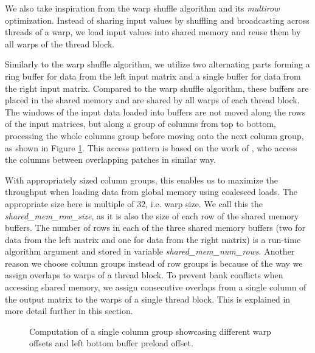 We also take inspiration from the warp shuffle algorithm and its \textit{multirow} optimization. Instead of sharing input values by shuffling and broadcasting across threads of a warp, we load input values into shared memory and reuse them by all warps of the thread block.

Similarly to the warp shuffle algorithm, we utilize two alternating parts forming a ring buffer for data from the left input matrix and a single buffer for data from the right input matrix. Compared to the warp shuffle algorithm,
these buffers are placed in the shared memory and are shared by all warps of each thread block. The windows of the input data loaded into buffers are not moved along the rows of the input matrices, but along a group of columns from top to bottom, processing the whole columns group before moving onto the next column group, as shown in Figure \ref{fig:shared_mem_buffer_iterations}. This access pattern is based on the work of \citet{paper:krulis_3d_block}, who access the columns between overlapping patches in similar way.


With appropriately sized column groups, this enables us to maximize the throughput when loading data from global memory using coalesced loads. The appropriate size here is multiple of 32, i.e. warp size.  We call this the \textit{shared\_mem\_row\_size}, as it is also the size of each row of the shared memory buffers. The number of rows in each of the three shared memory buffers (two for data from the left matrix and one for data from the right matrix) is a run-time algorithm argument and stored in variable \textit{shared\_mem\_num\_rows}.
Another reason we choose column groups instead of row groups is because of the way we assign overlaps to warps of a thread block. To prevent bank conflicts when accessing shared memory, we assign consecutive overlaps from a single column of the output matrix to the warps of a single thread block. This is explained in more detail further in this section.

\begin{figure}[ht]
	\centering
	\def\svgwidth{0.7\textwidth}
	\fontsize{8}{10}\selectfont
	
	\caption{Computation of a single column group showcasing different warp offsets and left bottom buffer preload offset.}
	\label{fig:shared_mem_buffer_iterations}
\end{figure}



